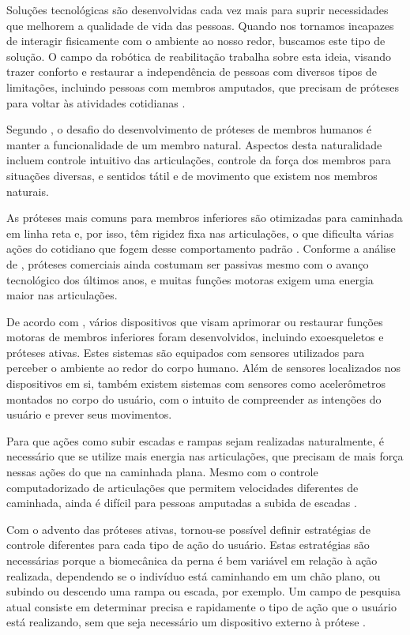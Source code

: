 Soluções tecnológicas são desenvolvidas cada vez mais para suprir necessidades que melhorem a qualidade de vida das pessoas. Quando nos tornamos incapazes de interagir fisicamente com o ambiente ao nosso redor, buscamos este tipo de solução. O campo da robótica de reabilitação trabalha sobre esta ideia, visando trazer conforto e restaurar a independência de pessoas com diversos tipos de limitações, incluindo pessoas com membros amputados, que precisam de próteses para voltar às atividades cotidianas \cite{siciliano:2008}.

Segundo , o desafio do desenvolvimento de próteses de membros humanos é manter a funcionalidade de um membro natural. Aspectos desta naturalidade incluem controle intuitivo das articulações, controle da força dos membros para situações diversas, e sentidos tátil e de movimento que existem nos membros naturais.

As próteses mais comuns para membros inferiores são otimizadas para caminhada em linha reta e, por isso, têm rigidez fixa nas articulações, o que dificulta várias ações do cotidiano que fogem desse comportamento padrão \cite{pew:2017}. Conforme a análise de , próteses comerciais ainda costumam ser passivas mesmo com o avanço tecnológico dos últimos anos, e muitas funções motoras exigem uma energia maior nas articulações.

De acordo com , vários dispositivos que visam aprimorar ou restaurar funções motoras de membros inferiores foram desenvolvidos, incluindo exoesqueletos e próteses ativas. Estes sistemas são equipados com sensores utilizados para perceber o ambiente ao redor do corpo humano. Além de sensores localizados nos dispositivos em si, também existem sistemas com sensores como acelerômetros montados no corpo do usuário, com o intuito de compreender as intenções do usuário e prever seus movimentos.

Para que ações como subir escadas e rampas sejam realizadas naturalmente, é necessário que se utilize mais energia nas articulações, que precisam de mais força nessas ações do que na caminhada plana. Mesmo com o controle computadorizado de articulações que permitem velocidades diferentes de caminhada, ainda é difícil para pessoas amputadas a subida de escadas \cite{dedic:2011}.

Com o advento das próteses ativas, tornou-se possível definir estratégias de controle diferentes para cada tipo de ação do usuário. Estas estratégias são necessárias porque a biomecânica da perna é bem variável em relação à ação realizada, dependendo se o indivíduo está caminhando em um chão plano, ou subindo ou descendo uma rampa ou escada, por exemplo. Um campo de pesquisa atual consiste em determinar precisa e rapidamente o tipo de ação que o usuário está realizando, sem que seja necessário um dispositivo externo à prótese \cite{stolyarov:2017}.

